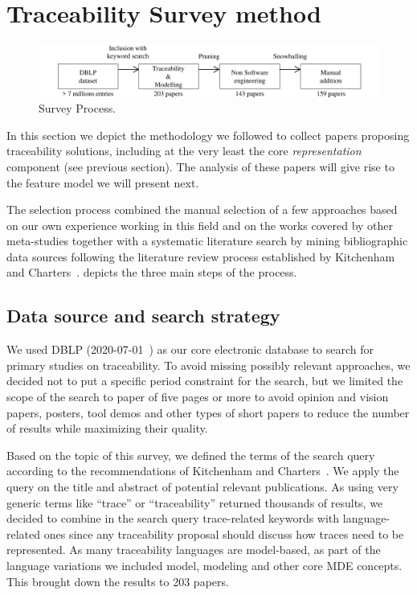 \section{Traceability Survey method } \label{sec:survey}
\begin{figure}[t]
	\centering
	\includegraphics[width=.9\linewidth]{images/survey-process}
	\caption{Survey Process. }
	\label{fig:surveyprocess}
\end{figure}

In this section we depict the methodology we followed to collect papers proposing traceability solutions, including at the very least the core \textit{representation} component (see previous section). The analysis of these papers will give rise to the feature model we will present next.

The selection process combined the manual selection of a few approaches based on our own experience working in this field and on the works covered by other meta-studies  \cite{Gotel2012,antoniol2017-traceability-grand-challenges,clelandhuang2014-traceability-trends-and-futurte-direction,guo2017-semantically-enhanced-tracebility-deep-learning} together with a systematic literature search by mining bibliographic data sources following the literature review process established by Kitchenham and Charters~\cite{kitchenham2008}.  depicts the three main steps of the process.

\subsection{Data source and search strategy}
We used DBLP (2020-07-01~\cite{dblp}) as our core electronic database to search for primary studies on traceability.
To avoid missing possibly relevant approaches, we decided not to put a specific period constraint for the search, but we limited the scope of the search to paper of five pages or more to avoid opinion and vision papers, posters, tool demos and other types of short papers to reduce the number of results while maximizing their quality.

Based on the topic of this survey, we defined the terms of the search query according to the recommendations of Kitchenham and Charters~\cite{kitchenham2008}. We apply the query on the title and abstract of potential relevant publications. As using very generic terms like ``trace'' or ``traceability'' returned thousands of results, we decided to combine in the search query trace-related keywords with language-related ones since any traceability proposal should discuss how traces need to be represented. As many traceability languages are model-based, as part of the language variations we included model, modeling and other core MDE concepts. This brought down the results to 203 papers. 

